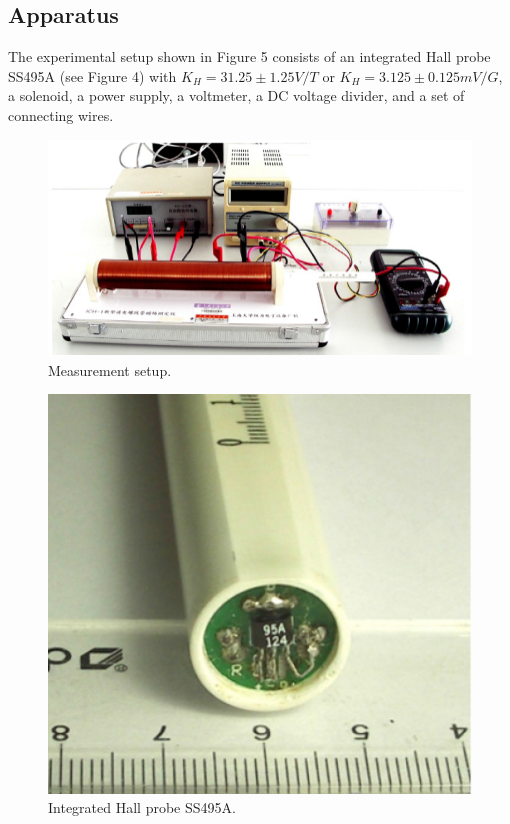 \documentclass{article}
\begin{document}
\subsection{Apparatus}

The experimental setup shown in Figure 5 consists of an integrated Hall probe SS495A (see Figure 4) with $ K_H = 31.25 \pm 1.25 V/T $ or $ K_H = 3.125 \pm 0.125 mV/G $, a solenoid, a power supply, a voltmeter, a DC voltage divider, and a set of connecting wires.
\begin{figure}[H]
	\centering
	\includegraphics[scale=0.6]{p3.png}
	\caption{Measurement setup.}
\end{figure}
\begin{figure}[H]
	\centering
	\includegraphics[scale=0.6]{p4.png}
	\caption{Integrated Hall probe SS495A.}
\end{figure}
\end{document}
